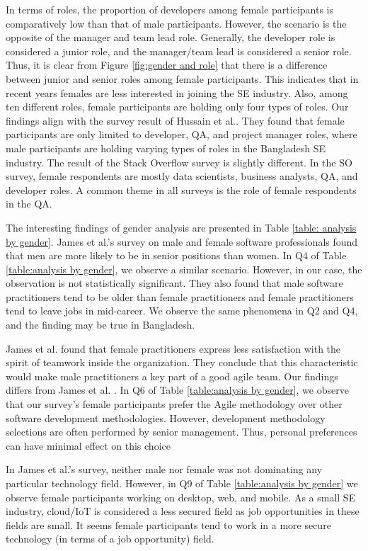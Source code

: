 In terms of roles, the proportion of developers among female participants is comparatively low than that of male participants. However, the scenario is the opposite of the manager and team lead role. Generally, the developer role is considered a junior role, and the manager/team lead is considered a senior role. Thus, it is clear from Figure \ref{fig:gender and role} that there is a difference between junior and senior roles among female participants. This indicates that in recent years females are less interested in joining the SE industry. Also, among ten different roles, female participants are holding only four types of roles. Our findings align with the survey result of Hussain et al.\cite{Hussain2020}. They found that female participants are only limited to developer, QA, and project manager roles, where male participants are holding varying types of roles in the Bangladesh SE industry. The result of the Stack Overflow survey\cite{StackoverflowSurvey2020} is slightly different. In the SO survey, female respondents are mostly data scientists, business analysts, QA, and developer roles. A common theme in all surveys is the role of female respondents in the QA.



The interesting findings of gender analysis are presented in Table \ref{table: analysis by gender}. James et al.'s\cite{James2017} survey on male and female software professionals found that men are more likely to be in senior positions than women. In Q4 of Table \ref{table:analysis by gender}, we observe a similar scenario. However, in our case, the observation is not statistically significant. They also found that male software practitioners tend to be older than female practitioners and female practitioners tend to leave jobs in mid-career. We observe the same phenomena in Q2 and Q4, and the finding may be true in Bangladesh.


James et al.\cite{James2017} found that female practitioners express less satisfaction with the spirit of teamwork inside the organization. They conclude that this characteristic would make male practitioners a key part of a good agile team. Our findings differs from James et al. \cite{James2017}. In Q6 of Table \ref{table:analysis by gender}, we observe that our survey's female participants prefer the Agile methodology over other software development methodologies. However, development methodology selections are often performed by senior management. Thus, personal preferences can have minimal effect on this choice

In James et al.'s survey, neither male nor female was not dominating any particular technology field. However, in Q9 of 
Table \ref{table:analysis by gender} we observe female participants working on desktop, web, and mobile. As a small SE industry, cloud/IoT is considered a less secured field as job opportunities in these fields are small. It seems female participants tend to work in a more secure technology (in terms of a job opportunity) field.